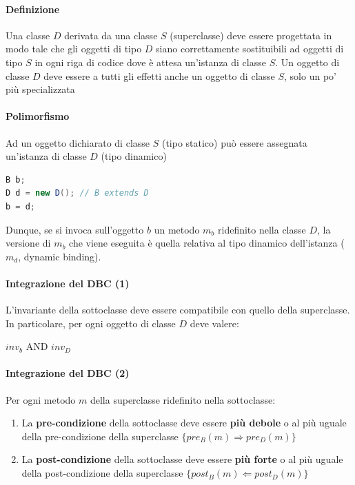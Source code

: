 \paragraph{Definizione} Una classe $D$ derivata da una classe $S$ (superclasse) deve essere progettata in modo tale che gli oggetti di tipo $D$ siano correttamente sostituibili ad oggetti di tipo $S$ in ogni riga di codice dove è attesa un’istanza di classe $S$. Un oggetto di classe $D$ deve essere a tutti gli effetti anche un oggetto di classe $S$, solo un po’ più specializzata

\paragraph{Polimorfismo} Ad un oggetto dichiarato di classe $S$ (tipo statico) può essere assegnata un'istanza di classe $D$ (tipo dinamico)
\begin{center}
\begin{lstlisting}[language=Java]
B b;
D d = new D(); // B extends D
b = d;
\end{lstlisting}
\end{center}
Dunque, se si invoca sull’oggetto $b$ un metodo $m_b$ ridefinito nella classe $D$, la versione di $m_b$ che viene eseguita è quella relativa al tipo dinamico dell’istanza ($m_d$, dynamic binding).

\paragraph{Integrazione del DBC (1)} L’invariante della sottoclasse deve essere compatibile con quello della superclasse. In particolare, per ogni oggetto di classe $D$ deve valere:
\begin{center}
    $inv_b$ AND $inv_D$
\end{center}

\paragraph{Integrazione del DBC (2)} Per ogni metodo $m$ della superclasse ridefinito nella sottoclasse:
\begin{enumerate}
    \item La \textbf{pre-condizione} della sottoclasse deve essere \textbf{più debole} o al più uguale della pre-condizione della superclasse $\{pre_B(m) \Rightarrow pre_D(m)\}$
    \item La \textbf{post-condizione} della sottoclasse deve essere \textbf{più forte} o al più uguale della post-condizione della superclasse $\{post_B(m) \Leftarrow post_D(m)\}$
\end{enumerate}

